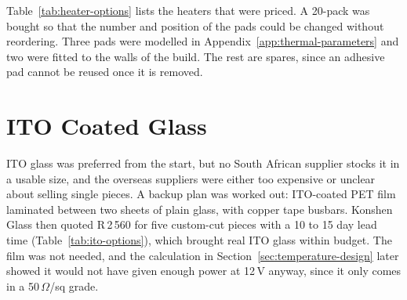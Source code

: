 Table~\ref{tab:heater-options} lists the heaters that were priced. A 20-pack was bought so that the number and position of the pads could be changed without reordering. Three pads were modelled in Appendix~\ref{app:thermal-parameters} and two were fitted to the walls of the build. The rest are spares, since an adhesive pad cannot be reused once it is removed.

\section{ITO Coated Glass}
\label{app:ito-options}

ITO glass was preferred from the start, but no South African supplier stocks it in a usable size, and the overseas suppliers were either too expensive or unclear about selling single pieces. A backup plan was worked out: ITO-coated PET film laminated between two sheets of plain glass, with copper tape busbars. Konshen Glass then quoted R\,2\,560 for five custom-cut pieces with a 10 to 15 day lead time (Table~\ref{tab:ito-options}), which brought real ITO glass within budget. The film was not needed, and the calculation in Section~\ref{sec:temperature-design} later showed it would not have given enough power at 12\,V anyway, since it only comes in a 50\,$\Omega$/sq grade.

